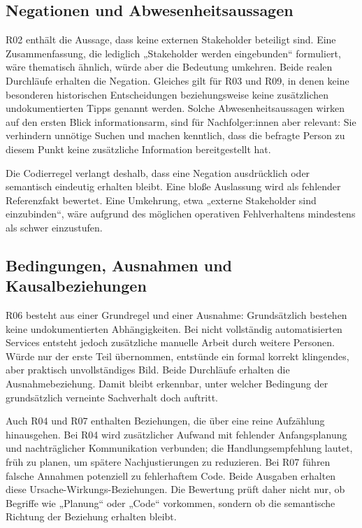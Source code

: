 \documentclass[
  10pt,
  ngerman,
  a4paper,
  toc=graduated,
  numbers=noenddot,
  headings=standardclasses,
  nonumberlist
]{scrartcl}
\begin{document}
\subsection{Negationen und Abwesenheitsaussagen}

R02 enthält die Aussage, dass keine externen Stakeholder beteiligt sind. Eine Zusammenfassung, die lediglich „Stakeholder werden eingebunden“ formuliert, wäre thematisch ähnlich, würde aber die Bedeutung umkehren. Beide realen Durchläufe erhalten die Negation. Gleiches gilt für R03 und R09, in denen keine besonderen historischen Entscheidungen beziehungsweise keine zusätzlichen undokumentierten Tipps genannt werden. Solche Abwesenheitsaussagen wirken auf den ersten Blick informationsarm, sind für Nachfolger:innen aber relevant: Sie verhindern unnötige Suchen und machen kenntlich, dass die befragte Person zu diesem Punkt keine zusätzliche Information bereitgestellt hat.

Die Codierregel verlangt deshalb, dass eine Negation ausdrücklich oder semantisch eindeutig erhalten bleibt. Eine bloße Auslassung wird als fehlender Referenzfakt bewertet. Eine Umkehrung, etwa „externe Stakeholder sind einzubinden“, wäre aufgrund des möglichen operativen Fehlverhaltens mindestens als schwer einzustufen.

\subsection{Bedingungen, Ausnahmen und Kausalbeziehungen}

R06 besteht aus einer Grundregel und einer Ausnahme: Grundsätzlich bestehen keine undokumentierten Abhängigkeiten. Bei nicht vollständig automatisierten Services entsteht jedoch zusätzliche manuelle Arbeit durch weitere Personen. Würde nur der erste Teil übernommen, entstünde ein formal korrekt klingendes, aber praktisch unvollständiges Bild. Beide Durchläufe erhalten die Ausnahmebeziehung. Damit bleibt erkennbar, unter welcher Bedingung der grundsätzlich verneinte Sachverhalt doch auftritt.

Auch R04 und R07 enthalten Beziehungen, die über eine reine Aufzählung hinausgehen. Bei R04 wird zusätzlicher Aufwand mit fehlender Anfangsplanung und nachträglicher Kommunikation verbunden; die Handlungsempfehlung lautet, früh zu planen, um spätere Nachjustierungen zu reduzieren. Bei R07 führen falsche Annahmen potenziell zu fehlerhaftem Code. Beide Ausgaben erhalten diese Ursache-Wirkungs-Beziehungen. Die Bewertung prüft daher nicht nur, ob Begriffe wie „Planung“ oder „Code“ vorkommen, sondern ob die semantische Richtung der Beziehung erhalten bleibt.
\end{document}
